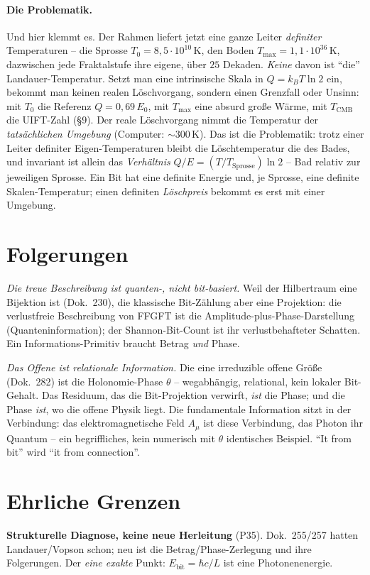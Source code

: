\paragraph{Die Problematik.} Und hier klemmt es. Der Rahmen liefert jetzt eine ganze Leiter
\emph{definiter} Temperaturen -- die Sprosse $T_0=8{,}5\cdot10^{10}$\,K, den Boden
$T_{\max}=1{,}1\cdot10^{36}$\,K, dazwischen jede Fraktalstufe ihre eigene, über $25$ Dekaden. \emph{Keine}
davon ist \enquote{die} Landauer-Temperatur. Setzt man eine intrinsische Skala in $Q=k_B T\ln2$ ein,
bekommt man keinen realen Löschvorgang, sondern einen Grenzfall oder Unsinn: mit $T_0$ die Referenz
$Q=0{,}69\,E_0$, mit $T_{\max}$ eine absurd große Wärme, mit $T_\text{CMB}$ die UIFT-Zahl (§9). Der reale
Löschvorgang nimmt die Temperatur der \emph{tatsächlichen Umgebung} (Computer: $\sim300$\,K). Das ist die
Problematik: trotz einer Leiter definiter Eigen-Temperaturen bleibt die Löschtemperatur die des Bades, und
invariant ist allein das \emph{Verhältnis} $Q/E=(T/T_\text{Sprosse})\ln2$ -- Bad relativ zur jeweiligen
Sprosse. Ein Bit hat eine definite Energie und, je Sprosse, eine definite Skalen-Temperatur; einen
definiten \emph{Löschpreis} bekommt es erst mit einer Umgebung.

\section{Folgerungen}
\emph{Die treue Beschreibung ist quanten-, nicht bit-basiert.} Weil der Hilbertraum eine Bijektion ist
(Dok.~230), die klassische Bit-Zählung aber eine Projektion: die verlustfreie Beschreibung von FFGFT ist
die Amplitude-plus-Phase-Darstellung (Quanteninformation); der Shannon-Bit-Count ist ihr verlustbehafteter
Schatten. Ein Informations-Primitiv braucht Betrag \emph{und} Phase.

\emph{Das Offene ist relationale Information.} Die eine irreduzible offene Größe (Dok.~282) ist die
Holonomie-Phase $\theta$ -- wegabhängig, relational, kein lokaler Bit-Gehalt. Das Residuum, das die
Bit-Projektion verwirft, \emph{ist} die Phase; und die Phase \emph{ist}, wo die offene Physik liegt. Die
fundamentale Information sitzt in der Verbindung: das elektromagnetische Feld $A_\mu$ ist diese Verbindung,
das Photon ihr Quantum -- ein begriffliches, kein numerisch mit $\theta$ identisches Beispiel.
\enquote{It from bit} wird \enquote{it from connection}.

\section{Ehrliche Grenzen}
\textbf{Strukturelle Diagnose, keine neue Herleitung} (P35). Dok.~255/257 hatten Landauer/Vopson schon;
neu ist die Betrag/Phase-Zerlegung und ihre Folgerungen. Der \emph{eine exakte} Punkt:
$E_\text{bit}=\hbar c/L$ ist eine Photonenenergie.

